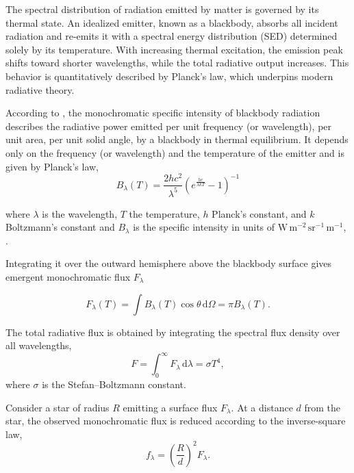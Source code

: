 



The spectral distribution of radiation emitted by matter is governed by its thermal state. An idealized emitter, known as a blackbody, absorbs all incident radiation and re-emits it with a spectral energy distribution (SED) determined solely by its temperature. With increasing thermal excitation, the emission peak shifts toward shorter wavelengths, while the total radiative output increases. This behavior is quantitatively described by Planck’s law, which underpins modern radiative theory.

According to \cite{1900planck}, the monochromatic specific intensity of blackbody radiation describes the radiative power emitted per unit frequency (or wavelength), per unit area, per unit solid angle, by a blackbody in thermal equilibrium. It depends only on the frequency (or wavelength) and the temperature of the emitter and is given by Planck’s law,
\begin{equation}
B_\lambda(T) = \frac{2 h c^2}{\lambda^5} \left( e^{\frac{h c}{\lambda k T}} - 1 \right)^{-1}
\end{equation}

where $\lambda$ is the wavelength, $T$ the temperature, $h$ Planck’s constant, and $k$ Boltzmann’s constant and $B_\lambda$ is the specific intensity in units of $\mathrm{W\,m^{-2}\,sr^{-1}\,m^{-1}}$, .

Integrating it over the outward hemisphere above the blackbody surface gives emergent monochromatic flux $F_\lambda$

\begin{equation}
F_\lambda(T) = \int B_\lambda(T)\cos\theta\,\mathrm{d}\Omega = \pi B_\lambda(T).
\end{equation}

The total radiative flux is obtained by integrating the spectral flux density over all wavelengths,
\begin{equation}
F = \int_{0}^{\infty} F_\lambda \, \mathrm{d}\lambda = \sigma T^{4},
\end{equation}
where $\sigma$ is the Stefan--Boltzmann constant.



Consider a star of radius $R$ emitting a surface flux $F_\lambda$. At a distance $d$ from the star, the observed monochromatic flux is reduced according to the inverse-square law,
\begin{equation}
f_\lambda = \left( \frac{R}{d} \right)^2 F_\lambda .
\end{equation}

